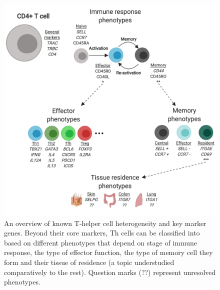 \begin{figure}[ht!]
    \centering    
    \includegraphics[width=1.0\textwidth]{Chapter1/Figs/chap1_fig3.png} %
    \caption[T-helper cell heterogeneity and key marker genes]{An overview of known T-helper cell heterogeneity and key marker genes. Beyond their core markers, Th cells can be classified into based on different phenotypes that depend on stage of immune response, the type of effector function, the type of memory cell they form and their tissue of residence (a topic understudied comparatively to the rest). Question marks (??) represent unresolved phenotypes.}
    \label{fig:chap1_fig3}
\end{figure}


